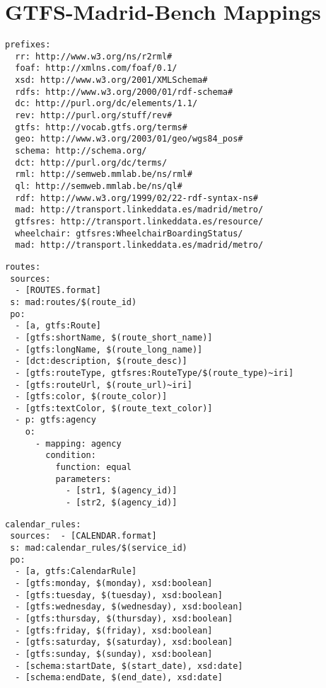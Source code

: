 \section{GTFS-Madrid-Bench Mappings}
\label{sec:appendix2}


\begin{lstlisting}[caption=Prefixes, label=lst:prefixes2, basicstyle=\small,frame=single]
prefixes:
  rr: http://www.w3.org/ns/r2rml#
  foaf: http://xmlns.com/foaf/0.1/
  xsd: http://www.w3.org/2001/XMLSchema#
  rdfs: http://www.w3.org/2000/01/rdf-schema#
  dc: http://purl.org/dc/elements/1.1/
  rev: http://purl.org/stuff/rev#
  gtfs: http://vocab.gtfs.org/terms#
  geo: http://www.w3.org/2003/01/geo/wgs84_pos#
  schema: http://schema.org/
  dct: http://purl.org/dc/terms/
  rml: http://semweb.mmlab.be/ns/rml#
  ql: http://semweb.mmlab.be/ns/ql#
  rdf: http://www.w3.org/1999/02/22-rdf-syntax-ns#
  mad: http://transport.linkeddata.es/madrid/metro/
  gtfsres: http://transport.linkeddata.es/resource/
  wheelchair: gtfsres:WheelchairBoardingStatus/
  mad: http://transport.linkeddata.es/madrid/metro/

\end{lstlisting}
\begin{lstlisting}[caption=Routes TripleMap, label=lst:routes, basicstyle=\small,frame=single]
routes:
 sources:
  - [ROUTES.format]
 s: mad:routes/$(route_id)
 po:
  - [a, gtfs:Route]
  - [gtfs:shortName, $(route_short_name)]
  - [gtfs:longName, $(route_long_name)]
  - [dct:description, $(route_desc)]
  - [gtfs:routeType, gtfsres:RouteType/$(route_type)~iri]
  - [gtfs:routeUrl, $(route_url)~iri]
  - [gtfs:color, $(route_color)]
  - [gtfs:textColor, $(route_text_color)]
  - p: gtfs:agency
    o:
      - mapping: agency
        condition:
          function: equal
          parameters:
            - [str1, $(agency_id)]
            - [str2, $(agency_id)]
\end{lstlisting}
\begin{lstlisting}[caption=Calendar\_Date TripleMap, label=lst:calendarDate, basicstyle=\small,frame=single]
calendar_rules:
 sources:  - [CALENDAR.format]
 s: mad:calendar_rules/$(service_id)
 po:
  - [a, gtfs:CalendarRule]
  - [gtfs:monday, $(monday), xsd:boolean]
  - [gtfs:tuesday, $(tuesday), xsd:boolean]
  - [gtfs:wednesday, $(wednesday), xsd:boolean]
  - [gtfs:thursday, $(thursday), xsd:boolean]
  - [gtfs:friday, $(friday), xsd:boolean]
  - [gtfs:saturday, $(saturday), xsd:boolean]
  - [gtfs:sunday, $(sunday), xsd:boolean]
  - [schema:startDate, $(start_date), xsd:date]
  - [schema:endDate, $(end_date), xsd:date]
\end{lstlisting}


